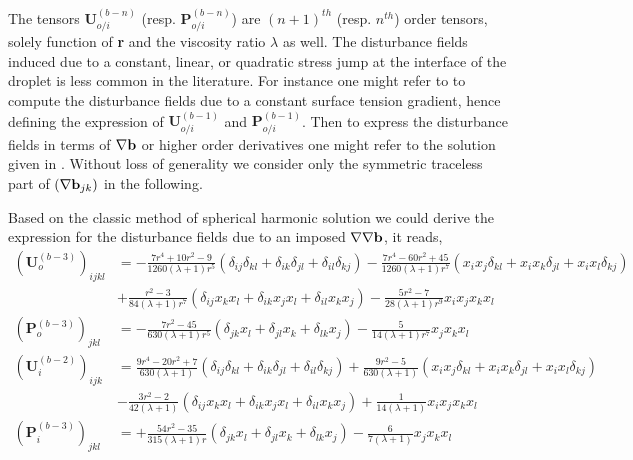 The tensors $\textbf{U}^{(b-n)}_{o/i}$ (resp. $\textbf{P}^{(b-n)}_{o/i}$) are $(n+1)^{th}$ (resp. $n^{th}$) order tensors, solely function of \textbf{r} and the viscosity ratio $\lambda$ as well. 
The disturbance fields induced due to a constant, linear, or quadratic stress jump at the interface of the droplet is less common in the literature. 
For instance one might refer to \citet{Subramanian_1985,leal2007advanced} to compute the disturbance fields due to a constant surface tension gradient, hence defining the expression of  $\textbf{U}_{o/i}^{(b-1)}$ and $\textbf{P}_{o/i}^{(b-1)}$. 
Then to express the disturbance fields in terms of $\mathbf{\nabla} \textbf{b}$ or higher order derivatives one might refer to the solution given in \citet[Appendix C]{raja2010inertial}.
Without loss of generality we consider only the symmetric traceless part of $(\mathbf{\nabla} \textbf{b}_{jk})$ in the following. 

Based on the classic method of spherical harmonic solution \citep[chapter 8]{leal2007advanced} we could derive the expression for the disturbance fields due to an imposed $\mathbf{\nabla}\mathbf{\nabla} \textbf{b}$, it reads,
\begin{align*}
    (\textbf{U}_o^{(b-3)})_{ijkl}
    &=
    -\frac{7r^4+10r^2-9}{1260(\lambda+1)r^5}(
        \delta_{ij}\delta_{kl}
        + \delta_{ik}\delta_{jl}
        + \delta_{il}\delta_{kj}
        )
    -\frac{7r^4-60r^2+45}{1260(\lambda+1)r^7}(
        x_ix_j\delta_{kl}
        + x_ix_k\delta_{jl}
        + x_ix_l\delta_{kj}
        )\\
    &+ \frac{r^2 -3}{84(\lambda +1)r^7}(
        \delta_{ij}x_kx_l
        + \delta_{ik}x_jx_l
        + \delta_{il}x_kx_j
    )
    - \frac{5r^2 - 7}{28(\lambda+1)r^9}x_ix_jx_kx_l
    \\
    (\textbf{P}_o^{(b-3)})_{jkl}
    &=
    -\frac{7r^2 - 45}{630(\lambda+1)r^5}(
        \delta_{jk}x_l
        + \delta_{jl}x_k
        + \delta_{lk}x_j
    )
    - \frac{5}{14(\lambda+1)r^7}x_jx_kx_l
    \\
    (\textbf{U}_i^{(b-2)})_{ijk}
    &=
    \frac{9r^4-20r^2+7}{630(\lambda+1)}(
        \delta_{ij}\delta_{kl}
        + \delta_{ik}\delta_{jl}
        + \delta_{il}\delta_{kj}
    )
    +\frac{9r^2-5}{630(\lambda+1)}(
        x_ix_j\delta_{kl}
        + x_ix_k\delta_{jl}
        + x_ix_l\delta_{kj}
        )\\
    &- \frac{3r^2-2}{42(\lambda +1)}(
        \delta_{ij}x_kx_l
        + \delta_{ik}x_jx_l
        + \delta_{il}x_kx_j
    )
    + \frac{1}{14(\lambda+1)}x_ix_jx_kx_l
    \\
    (\textbf{P}_i^{(b-3)})_{jkl}
    &=
    +\frac{54r^2 - 35}{315(\lambda+1)r}(
        \delta_{jk}x_l
        + \delta_{jl}x_k
        + \delta_{lk}x_j
    )
    - \frac{6}{7(\lambda+1)}x_jx_kx_l
\end{align*}

